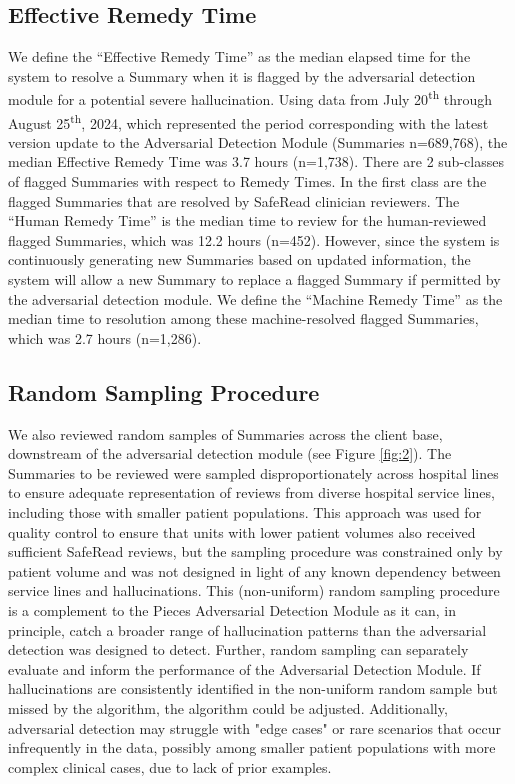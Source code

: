 \documentclass{style/myclass}
\begin{document}
\subsection{Effective Remedy Time}

We define the “Effective Remedy Time” as the median elapsed time for the system to resolve a Summary when it is flagged by the adversarial detection module for a potential severe hallucination. Using data from July 20\textsuperscript{th} through August 25\textsuperscript{th}, 2024, which represented the period corresponding with the latest version update to the Adversarial Detection Module (Summaries n=689,768), the median Effective Remedy Time was 3.7 hours (n=1,738). There are 2 sub-classes of flagged Summaries with respect to Remedy Times. In the first class are the flagged Summaries that are resolved by SafeRead clinician reviewers. The “Human Remedy Time” is the median time to review for the human-reviewed flagged Summaries, which was 12.2 hours (n=452). However, since the system is continuously generating new Summaries based on updated information, the system will allow a new Summary to replace a flagged Summary if permitted by the adversarial detection module. We define the “Machine Remedy Time” as the median time to resolution among these machine-resolved flagged Summaries, which was 2.7 hours (n=1,286).

\subsection{Random Sampling Procedure}

We also reviewed random samples of Summaries across the client base, downstream of the adversarial detection module (see Figure \ref{fig:2}). The Summaries to be reviewed were sampled disproportionately across hospital lines to ensure adequate representation of reviews from diverse hospital service lines, including those with smaller patient populations. This approach was used for quality control to ensure that units with lower patient volumes also received sufficient SafeRead reviews, but the sampling procedure was constrained only by patient volume and was not designed in light of any known dependency between service lines and hallucinations. This (non-uniform) random sampling procedure is a complement to the Pieces Adversarial Detection Module as it can, in principle, catch a broader range of hallucination patterns than the adversarial detection was designed to detect. Further, random sampling can separately evaluate and inform the performance of the Adversarial Detection Module. If hallucinations are consistently identified in the non-uniform random sample but missed by the algorithm, the algorithm could be adjusted. Additionally, adversarial detection may struggle with "edge cases" or rare scenarios that occur infrequently in the data, possibly among smaller patient populations with more complex clinical cases, due to lack of prior examples.
\end{document}
